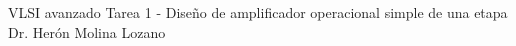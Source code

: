 




	\pnormal
	{VLSI avanzado}
	{Tarea 1 - Diseño de amplificador operacional simple de una etapa}
	{Dr. Herón Molina Lozano}
	\tableofcontents
	
	\newpage 



